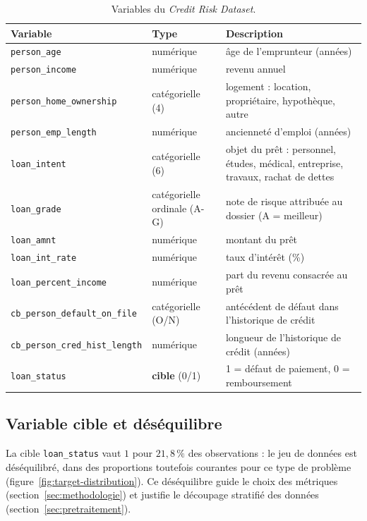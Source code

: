 \begin{table}[H]
  \centering
  \caption{Variables du \emph{Credit Risk Dataset}.}
  \label{tab:variables}
  \small
  \begin{tabular}{llp{7.2cm}}
    \toprule
    \textbf{Variable} & \textbf{Type} & \textbf{Description} \\
    \midrule
    \texttt{person\_age} & numérique & âge de l'emprunteur (années) \\
    \texttt{person\_income} & numérique & revenu annuel \\
    \texttt{person\_home\_ownership} & catégorielle (4) & logement : location, propriétaire, hypothèque, autre \\
    \texttt{person\_emp\_length} & numérique & ancienneté d'emploi (années) \\
    \texttt{loan\_intent} & catégorielle (6) & objet du prêt : personnel, études, médical, entreprise, travaux, rachat de dettes \\
    \texttt{loan\_grade} & catégorielle ordinale (A-G) & note de risque attribuée au dossier (A = meilleur) \\
    \texttt{loan\_amnt} & numérique & montant du prêt \\
    \texttt{loan\_int\_rate} & numérique & taux d'intérêt (\%) \\
    \texttt{loan\_percent\_income} & numérique & part du revenu consacrée au prêt \\
    \texttt{cb\_person\_default\_on\_file} & catégorielle (O/N) & antécédent de défaut dans l'historique de crédit \\
    \texttt{cb\_person\_cred\_hist\_length} & numérique & longueur de l'historique de crédit (années) \\
    \midrule
    \texttt{loan\_status} & \textbf{cible} (0/1) & 1 = défaut de paiement, 0 = remboursement \\
    \bottomrule
  \end{tabular}
\end{table}

\subsection{Variable cible et déséquilibre}

La cible \texttt{loan\_status} vaut $1$ pour $21{,}8\,\%$ des observations : le
jeu de données est déséquilibré, dans des proportions toutefois courantes pour
ce type de problème (figure~\ref{fig:target-distribution}). Ce déséquilibre
guide le choix des métriques (section~\ref{sec:methodologie}) et justifie le
découpage stratifié des données (section~\ref{sec:pretraitement}).

